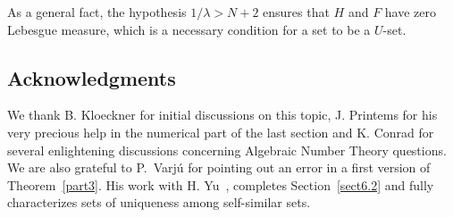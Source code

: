\documentclass[AHL,Unicode,longabstracts,published]{cedram}
\begin{document}
\begin{rema}
As a general fact, the hypothesis $1/\lambda>N+2$ ensures that $H$ and $F$ have zero Lebesgue measure, which is a necessary condition for a set to be a $U$-set.
\end{rema}



\subsection*{Acknowledgments}
We thank B. Kloeckner for initial discussions on this topic, J. Printems for his very precious help in the numerical part of the last section and K. Conrad for several enlightening discussions concerning Algebraic Number Theory questions. We are also grateful to P.~Varjú for pointing out an error in a first version of Theorem~\ref{part3}. His work with H. Yu~\cite{varjuhu}, completes Section~\ref{sect6.2} and fully characterizes sets of uniqueness among self-similar sets.






\end{document}

